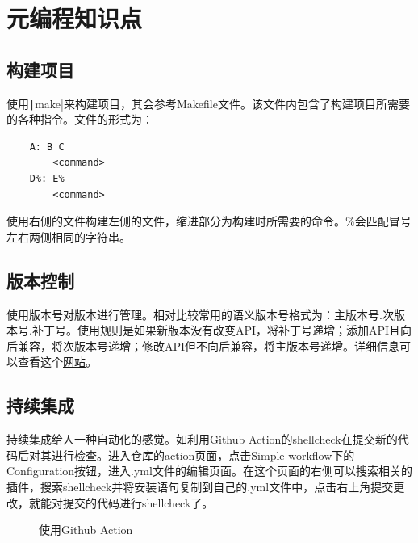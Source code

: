 \documentclass[fontset=ubuntu]{ctexart}
\begin{document}
\section{元编程知识点}
\subsection{构建项目}
使用\texttt|make|来构建项目，其会参考Makefile文件。该文件内包含了构建项目所需要的各种指令。文件的形式为：
\begin{listing}[htb]
    \begin{verbatim}
    A: B C
        <command>
    D%: E%
        <command>
    \end{verbatim}
\end{listing}

使用右侧的文件构建左侧的文件，缩进部分为构建时所需要的命令。\%会匹配冒号左右两侧相同的字符串。

\subsection{版本控制}
使用版本号对版本进行管理。相对比较常用的语义版本号格式为：主版本号.次版本号.补丁号。使用规则是如果新版本没有改变API，将补丁号递增；添加API且向后兼容，将次版本号递增；修改API但不向后兼容，将主版本号递增。详细信息可以查看这个\href{https://semver.org/}{网站}。

\subsection{持续集成}
持续集成给人一种自动化的感觉。如利用Github Action的shellcheck在提交新的代码后对其进行检查。进入仓库的action页面，点击Simple workflow下的Configuration按钮，进入.yml文件的编辑页面。在这个页面的右侧可以搜索相关的插件，搜索shellcheck并将安装语句复制到自己的.yml文件中，点击右上角提交更改，就能对提交的代码进行shellcheck了。
\begin{figure}[htb]
    \centering
    \caption{使用Github Action}
    \label{action}
\end{figure}
\end{document}
